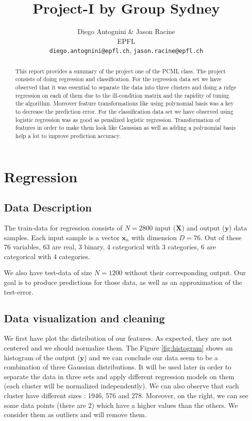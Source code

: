 \documentclass{article} %
\title{Project-I by Group Sydney}
\author{
Diego Antognini \& Jason Racine\\
EPFL \\
\texttt{diego.antognini@epfl.ch}, \texttt{jason.racine@epfl.ch} \\
}
\begin{document}
\maketitle

\begin{abstract}
This report provides a summary of the project one of the PCML class. The project consists of doing regression and classification. For the regression data set we have observed that it was essential to separate the data into three clusters and doing a ridge regression on each of them due to the ill-condition matrix and the rapidity of tuning the algorithm. Moreover feature transformations like using polynomial basis was a key to decrease the prediction error. For the classification data set we have observed using logistic regression was as good as penalized logistic regression. Transformation of features in order to make them look like Gaussian as well as adding a polynomial basis help a lot to improve prediction accuracy.
\end{abstract}

\section{Regression}

\subsection{Data Description}

The train-data for regression consists of $N = 2800$ input ($\mathbf{X}$) and output ($\mathbf{y}$) data samples. Each input sample is a vector $\mathbf{x}_n$ with dimension $D = 76$. Out of these $76$ variables, $63$ are real, $3$ binary, $4$ categorical with 3 categories, $6$ are categorical with 4 categories.

We also have test-data of size $N=1200$ without their corresponding output. Our goal is to produce predictions for those data, as well as an approximation of the test-error.

\subsection{Data visualization and cleaning}

We first have plot the distribution of our features. As expected, they are not centered and we should normalize them. The Figure \ref{fig:histogram} shows an histogram of the output ($\mathbf{y}$) and we can conclude our data  seem to be a combination of three Gaussian distributions. It will be used later in order to separate the data in three sets and apply different regression models on them (each cluster will be normalized independently). We can also observe that each cluster have different sizes : 1946, 576 and 278. Moreover, on the right, we can see some data points (there are $2$) which have a higher values than the others. We consider them as outliers and will remove them.
\end{document}
